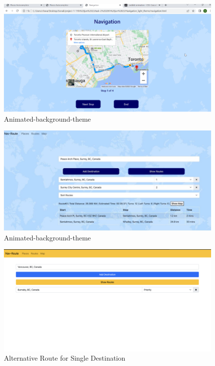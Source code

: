 \documentclass{article}
\begin{document}
\begin{figure}
  \centering
  \includegraphics[width=1\textwidth]{NithishFinal/Picture8.png}
  \caption{Animated-background-theme }
  \label{fig:example}
\end{figure}

\begin{figure}
  \centering
  \includegraphics[width=1\textwidth]{NithishFinal/Picture9.jpg}
  \caption{Animated-background-theme }
  \label{fig:example}
\end{figure}

\begin{figure}
  \centering
  \includegraphics[width=1\textwidth]{NithishFinal/ARSS1.png}
  \caption{Alternative Route for Single Destination}
  \label{fig:example}
\end{figure}
\end{document}
